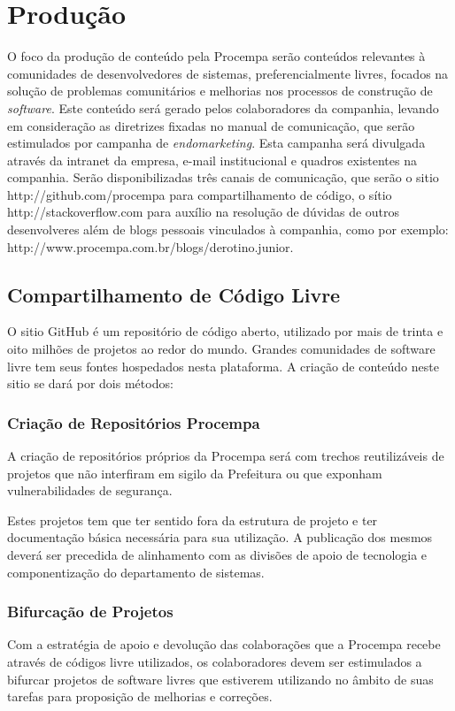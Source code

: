\chapter{Produção}

O foco da produção de conteúdo pela Procempa serão conteúdos relevantes à comunidades de desenvolvedores de sistemas, preferencialmente livres, focados na solução de problemas comunitários e melhorias nos processos de construção de \emph{software}.
Este conteúdo será gerado pelos colaboradores da companhia, levando em consideração as diretrizes fixadas no manual de comunicação, que serão estimulados por campanha de \emph{endomarketing}. Esta campanha será divulgada através da intranet da empresa, e-mail institucional e quadros existentes na companhia.
Serão disponibilizadas três canais de comunicação, que serão o sitio http://github.com/procempa para compartilhamento de código, o sítio http://stackoverflow.com para auxílio na resolução de dúvidas de outros desenvolveres além de blogs pessoais vinculados à companhia, como por exemplo: http://www.procempa.com.br/blogs/derotino.junior.

\section{Compartilhamento de Código Livre}
O sitio GitHub é um repositório de código aberto, utilizado por mais de trinta e oito milhões de projetos ao redor do mundo. Grandes comunidades de software livre tem seus fontes hospedados nesta plataforma.
A criação de conteúdo neste sitio se dará por dois métodos:

\subsection{Criação de Repositórios Procempa}
A criação de repositórios próprios da Procempa será com trechos reutilizáveis de projetos que não interfiram em sigilo da Prefeitura ou que exponham vulnerabilidades de segurança.

Estes projetos tem que ter sentido fora da estrutura de projeto e ter documentação básica necessária para sua utilização. A publicação dos mesmos deverá ser precedida de alinhamento com as divisões de apoio de tecnologia e componentização do departamento de sistemas.

\subsection{Bifurcação de Projetos}
Com a estratégia de apoio e devolução das colaborações que a Procempa recebe através de códigos livre utilizados, os colaboradores devem ser estimulados a bifurcar projetos de software livres que estiverem utilizando no âmbito de suas tarefas para proposição de melhorias e correções.

